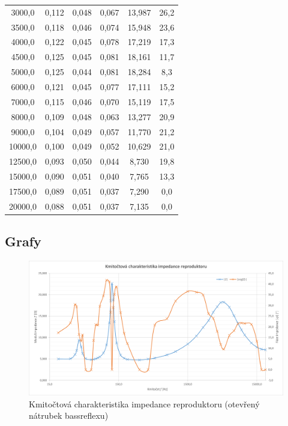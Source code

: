 \documentclass[a4paper, czech]{article}
\begin{document}
\begin{table}[H]
\begin{tabular}{cccccc}
3000,0  & 0,112 & 0,048 & 0,067 & 13,987 & 26,2 \\
3500,0  & 0,118 & 0,046 & 0,074 & 15,948 & 23,6 \\
4000,0  & 0,122 & 0,045 & 0,078 & 17,219 & 17,3 \\
4500,0  & 0,125 & 0,045 & 0,081 & 18,161 & 11,7 \\
5000,0  & 0,125 & 0,044 & 0,081 & 18,284 & 8,3  \\
6000,0  & 0,121 & 0,045 & 0,077 & 17,111 & 15,2 \\
7000,0  & 0,115 & 0,046 & 0,070 & 15,119 & 17,5 \\
8000,0  & 0,109 & 0,048 & 0,063 & 13,277 & 20,9 \\
9000,0  & 0,104 & 0,049 & 0,057 & 11,770 & 21,2 \\
10000,0 & 0,100 & 0,049 & 0,052 & 10,629 & 21,0 \\
12500,0 & 0,093 & 0,050 & 0,044 & 8,730  & 19,8 \\
15000,0 & 0,090 & 0,051 & 0,040 & 7,765  & 13,3 \\
17500,0 & 0,089 & 0,051 & 0,037 & 7,290  & 0,0  \\
20000,0 & 0,088 & 0,051 & 0,037 & 7,135  & 0,0 \\
        \bottomrule
    \end{tabular}
\end{table}

\subsection{Grafy}

\begin{figure}[H]
    \centering
    \includegraphics[width=\textwidth]{graf3b_otevreny.png}
    \caption{Kmitočtová charakteristika impedance reproduktoru (otevřený nátrubek bassreflexu)}
\end{figure}
\end{document}
